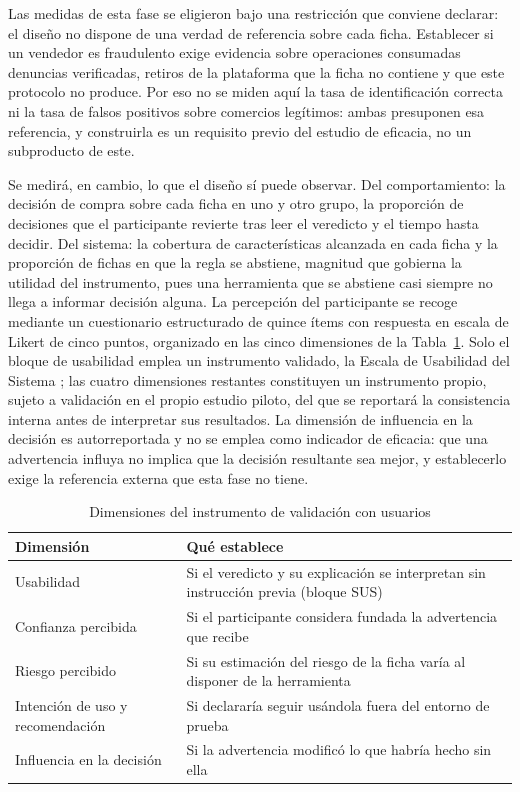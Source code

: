 Las medidas de esta fase se eligieron bajo una restricción que conviene declarar: el diseño no
dispone de una verdad de referencia sobre cada ficha. Establecer si un vendedor es fraudulento
exige evidencia sobre operaciones consumadas denuncias verificadas, retiros de la plataforma
que la ficha no contiene y que este protocolo no produce. Por eso no se miden aquí la tasa de
identificación correcta ni la tasa de falsos positivos sobre comercios legítimos: ambas
presuponen esa referencia, y construirla es un requisito previo del estudio de eficacia, no un
subproducto de este.

Se medirá, en cambio, lo que el diseño sí puede observar. Del comportamiento: la decisión de
compra sobre cada ficha en uno y otro grupo, la proporción de decisiones que el participante
revierte tras leer el veredicto y el tiempo hasta decidir. Del sistema: la cobertura de
características alcanzada en cada ficha y la proporción de fichas en que la regla se abstiene,
magnitud que gobierna la utilidad del instrumento, pues una herramienta que se abstiene casi
siempre no llega a informar decisión alguna. La percepción del participante se recoge mediante
un cuestionario estructurado de quince ítems con respuesta en escala de Likert de cinco
puntos, organizado en las cinco dimensiones de la Tabla~\ref{tab:instrumento}. Solo el bloque
de usabilidad emplea un instrumento validado, la Escala de Usabilidad del Sistema
\cite{ref23}; las cuatro dimensiones restantes constituyen un instrumento propio, sujeto a
validación en el propio estudio piloto, del que se reportará la consistencia interna antes de
interpretar sus resultados. La dimensión de influencia en la decisión es autorreportada y no
se emplea como indicador de eficacia: que una advertencia influya no implica que la decisión
resultante sea mejor, y establecerlo exige la referencia externa que esta fase no tiene.

\begin{table}[t]
\caption{Dimensiones del instrumento de validación con usuarios}
\label{tab:instrumento}
\centering
\footnotesize
\setlength{\tabcolsep}{3.5pt}
\renewcommand{\arraystretch}{1.15}
\begin{tabular}{@{}p{2.35cm}p{5.3cm}@{}}
\toprule
\textbf{Dimensión} & \textbf{Qué establece} \\
\midrule
Usabilidad & Si el veredicto y su explicación se interpretan sin instrucción previa (bloque SUS) \\
Confianza percibida & Si el participante considera fundada la advertencia que recibe \\
Riesgo percibido & Si su estimación del riesgo de la ficha varía al disponer de la herramienta \\
Intención de uso y recomendación & Si declararía seguir usándola fuera del entorno de prueba \\
Influencia en la decisión & Si la advertencia modificó lo que habría hecho sin ella \\
\bottomrule
\end{tabular}
\end{table}

